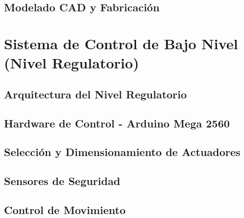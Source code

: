 \documentclass[a4paper,12pt]{report}
\begin{document}
\subsection{Modelado CAD y Fabricación}




\section{Sistema de Control de Bajo Nivel (Nivel Regulatorio)}

\subsection{Arquitectura del Nivel Regulatorio}


\subsection{Hardware de Control - Arduino Mega 2560}



\subsection{Selección y Dimensionamiento de Actuadores}




\subsection{Sensores de Seguridad}



\subsection{Control de Movimiento}



\end{document}
